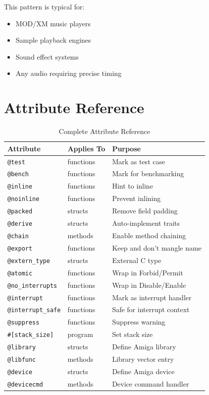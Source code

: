 This pattern is typical for:
\begin{itemize}
    \item MOD/XM music players
    \item Sample playback engines
    \item Sound effect systems
    \item Any audio requiring precise timing
\end{itemize}

\section{Attribute Reference}
\label{sec:attribute-reference}

\begin{table}[h]
\centering
\begin{tabular}{llp{6cm}}
\hline
\textbf{Attribute} & \textbf{Applies To} & \textbf{Purpose} \\
\hline
\texttt{@test} & functions & Mark as test case \\
\texttt{@bench} & functions & Mark for benchmarking \\
\texttt{@inline} & functions & Hint to inline \\
\texttt{@noinline} & functions & Prevent inlining \\
\texttt{@packed} & structs & Remove field padding \\
\texttt{@derive} & structs & Auto-implement traits \\
\texttt{@chain} & methods & Enable method chaining \\
\texttt{@export} & functions & Keep and don't mangle name \\
\texttt{@extern\_type} & structs & External C type \\
\texttt{@atomic} & functions & Wrap in Forbid/Permit \\
\texttt{@no\_interrupts} & functions & Wrap in Disable/Enable \\
\texttt{@interrupt} & functions & Mark as interrupt handler \\
\texttt{@interrupt\_safe} & functions & Safe for interrupt context \\
\texttt{@suppress} & functions & Suppress warning \\
\texttt{\#[stack\_size]} & program & Set stack size \\
\texttt{@library} & structs & Define Amiga library \\
\texttt{@libfunc} & methods & Library vector entry \\
\texttt{@device} & structs & Define Amiga device \\
\texttt{@devicecmd} & methods & Device command handler \\
\hline
\end{tabular}
\caption{Complete Attribute Reference}
\end{table}

